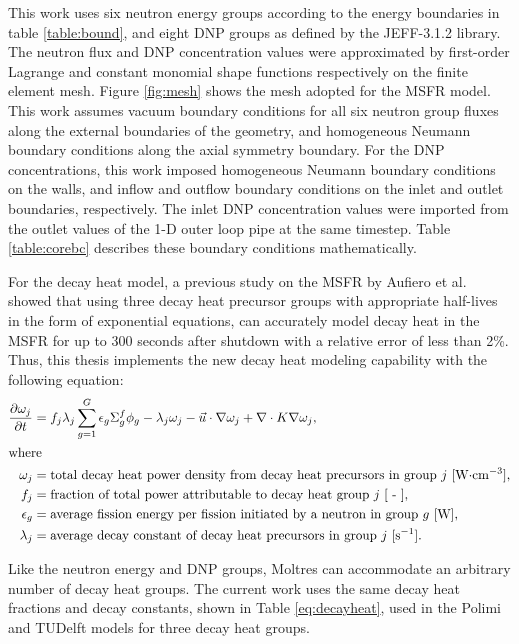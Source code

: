 This work uses six neutron energy groups according to the
energy boundaries in table \ref{table:bound}, and eight \gls{DNP} groups as
defined by the JEFF-3.1.2 library. The neutron flux
and \gls{DNP} concentration values were approximated by first-order Lagrange
and constant monomial shape functions respectively on the finite element mesh.
Figure \ref{fig:mesh} shows the mesh adopted for the \gls{MSFR} model.
This work assumes vacuum boundary conditions for all six neutron group fluxes
along the external boundaries of the geometry, and homogeneous Neumann
boundary conditions along the axial symmetry boundary. For the \gls{DNP}
concentrations, this work imposed homogeneous Neumann boundary conditions on
the walls, and inflow and outflow boundary conditions on the inlet and outlet
boundaries, respectively. The inlet \gls{DNP} concentration values were
imported from the outlet values of the 1-D outer loop pipe at the same
timestep. Table \ref{table:corebc} describes these boundary conditions
mathematically.

For the decay heat model, a previous study on the MSFR by Aufiero et al.
\cite{aufiero_extended_2013} showed that using three decay heat precursor
groups with appropriate half-lives in the form of exponential equations, can
accurately model decay heat in the MSFR for up to 300 seconds after shutdown
with a relative error of less than 2\%. Thus, this thesis implements the new
decay heat modeling capability with the following equation:
%
\pagebreak
\begin{align}
	\frac{\partial \omega_j}{\partial t} &= f_j \lambda_j \sum^G_{g=1}
	\epsilon_{g}
	\Sigma^f_{g} \phi_{g} - \lambda_j \omega_j - \vec{u} \cdot \nabla
	\omega_j + \nabla \cdot K \nabla \omega_j, \label{eq:decayheat} \\
	\intertext{where}
    \omega_j &= \text{total decay heat power density from decay heat
    precursors in group $j$ [W$\cdot$cm$^{-3}$],} \nonumber \\
	f_j &= \text{fraction of total power attributable to decay heat group
	$j$ [ - ],} \nonumber \\
	\epsilon_g &= \text{average fission energy per fission initiated by a
	neutron in group $g$ [W],} \nonumber \\
	\lambda_j &= \text{average decay constant of decay heat precursors in
	group $j$ [s$^{-1}$].} \nonumber
\end{align}

Like the neutron energy and \gls{DNP} groups, Moltres can accommodate an
arbitrary number of decay heat groups. The current work uses the same decay
heat fractions and decay constants, shown in Table \ref{eq:decayheat}, used in
the Polimi and TUDelft models for three decay heat groups.

